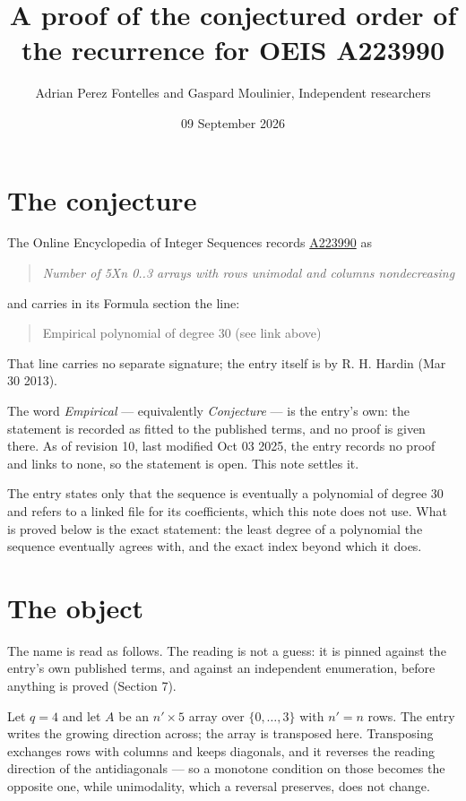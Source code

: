 \documentclass[11pt]{article}
\title{A proof of the conjectured order of the recurrence for OEIS A223990}
\author{Adrian Perez Fontelles and Gaspard Moulinier, Independent researchers}
\date{09 September 2026}
\theoremstyle{definition}
\begin{document}
\maketitle
\section{The conjecture}

The Online Encyclopedia of Integer Sequences records \href{https://oeis.org/A223990}{A223990} as

\begin{quote}\itshape Number of 5Xn 0..3 arrays with rows unimodal and columns nondecreasing\end{quote}

and carries in its Formula section the line:

\begin{quote}\ttfamily Empirical polynomial of degree 30 (see link above)\end{quote}

That line carries no separate signature; the entry itself is by R. H. Hardin (Mar 30 2013).

The word {\itshape Empirical} --- equivalently {\itshape Conjecture} --- is the entry's own: the statement is recorded as fitted to the published terms, and no proof is given there. As of revision 10, last modified Oct 03 2025, the entry records no proof and links to none, so the statement is open. This note settles it.

The entry states only that the sequence is eventually a polynomial of degree $30$ and refers to a linked file for its coefficients, which this note does not use. What is proved below is the exact statement: the least degree of a polynomial the sequence eventually agrees with, and the exact index beyond which it does.

\section{The object}

The name is read as follows. The reading is not a guess: it is pinned against the entry's own published terms, and against an independent enumeration, before anything is proved (Section 7).

Let $q = 4$ and let $A$ be an $n' \times 5$ array over $\{0,\dots,3\}$ with $n' = n$ rows. The entry writes the growing direction across; the array is transposed here. Transposing exchanges rows with columns and keeps diagonals, and it reverses the reading direction of the antidiagonals --- so a monotone condition on those becomes the opposite one, while unimodality, which a reversal preserves, does not change.
\end{document}
